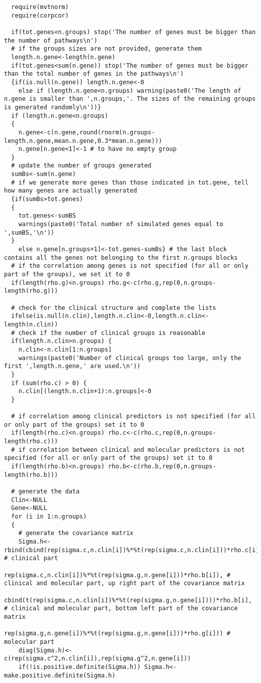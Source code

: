 \begin{lstlisting}
  require(mvtnorm)
  require(corpcor)

  if(tot.genes<n.groups) stop('The number of genes must be bigger than the number of pathways\n')
  # if the groups sizes are not provided, generate them
  length.n.gene<-length(n.gene)
  if(tot.genes<sum(n.gene)) stop('The number of genes must be bigger than the total number of genes in the pathways\n')
  {if(is.null(n.gene)) length.n.gene<-0
    else if (length.n.gene<n.groups) warning(paste0('The length of n.gene is smaller than ',n.groups,'. The sizes of the remaining groups is generated randomly\n'))}
  if (length.n.gene<n.groups)
  {
    n.gene<-c(n.gene,round(rnorm(n.groups-length.n.gene,mean.n.gene,0.3*mean.n.gene)))
    n.gene[n.gene<1]<-1 # to have no empty group
  }
  # update the number of groups generated
  sumBs<-sum(n.gene)
  # if we generate more genes than those indicated in tot.gene, tell how many genes are actually generated
  {if(sumBs>tot.genes)
  {
    tot.genes<-sumBS
    warnings(paste0('Total number of simulated genes equal to ',sumBS,'\n'))
  }
    else n.gene[n.groups+1]<-tot.genes-sumBs} # the last block contains all the genes not belonging to the first n.groups blocks
  # if the correlation among genes is not specified (for all or only part of the groups), we set it to 0
  if(length(rho.g)<n.groups) rho.g<-c(rho.g,rep(0,n.groups-length(rho.g)))

  # check for the clinical structure and complete the lists
  ifelse(is.null(n.clin),length.n.clin<-0,length.n.clin<-length(n.clin))
  # check if the number of clinical groups is reasonable
  if(length.n.clin>n.groups) {
    n.clin<-n.clin[1:n.groups]
    warnings(paste0('Number of clinical groups too large, only the first ',length.n.gene,' are used.\n'))
  }
  if (sum(rho.c) > 0) {
    n.clin[(length.n.clin+1):n.groups]<-0
  }

  # if correlation among clinical predictors is not specified (for all or only part of the groups) set it to 0
  if(length(rho.c)<n.groups) rho.c<-c(rho.c,rep(0,n.groups-length(rho.c)))
  # if correlation between clinical and molecular predictors is not specified (for all or only part of the groups) set it to 0
  if(length(rho.b)<n.groups) rho.b<-c(rho.b,rep(0,n.groups-length(rho.b)))

  # generate the data
  Clin<-NULL
  Gene<-NULL
  for (i in 1:n.groups)
  {
    # generate the covariance matrix
    Sigma.h<-rbind(cbind(rep(sigma.c,n.clin[i])%*%t(rep(sigma.c,n.clin[i]))*rho.c[i], # clinical part
                         rep(sigma.c,n.clin[i])%*%t(rep(sigma.g,n.gene[i]))*rho.b[i]), # clinical and molecular part, up right part of the covariance matrix
                   cbind(t(rep(sigma.c,n.clin[i])%*%t(rep(sigma.g,n.gene[i])))*rho.b[i], # clinical and molecular part, bottom left part of the covariance matrix
                         rep(sigma.g,n.gene[i])%*%t(rep(sigma.g,n.gene[i]))*rho.g[i])) # molecular part
    diag(Sigma.h)<-c(rep(sigma.c^2,n.clin[i]),rep(sigma.g^2,n.gene[i]))
    if(!is.positive.definite(Sigma.h)) Sigma.h<-make.positive.definite(Sigma.h)


\end{lstlisting}
